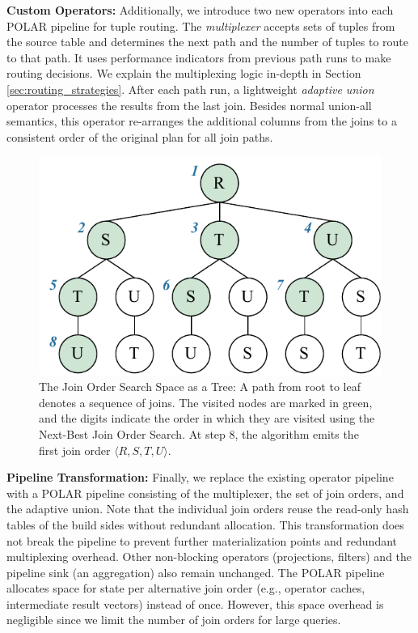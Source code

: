 \textbf{Custom Operators:} Additionally, we introduce two new operators into each POLAR pipeline for tuple routing. The \emph{multiplexer} accepts sets of tuples from the source table and determines the next path and the number of tuples to route to that path. It uses performance indicators from previous path runs to make routing decisions. We explain the multiplexing logic in-depth in Section \ref{sec:routing_strategies}. After each path run, a lightweight \emph{adaptive union} operator processes the results from the last join. Besides normal union-all semantics, this operator re-arranges the additional columns from the joins to a consistent order of the original plan for all join paths.

\begin{figure}[!t]
    \centering
    \includegraphics[width=0.6\linewidth]{figures/join_order_search_space.pdf}
    \vspace{-0.15cm}
    \caption{The Join Order Search Space as a Tree: A path from root to leaf denotes a sequence of joins. The visited nodes are marked in green, and the digits indicate the order in which they are visited using the Next-Best Join Order Search. At step 8, the algorithm emits the first join order $\langle R, S, T, U \rangle$.}
    \label{fig:search_space}
    \vspace{-0.3cm}
\end{figure}

\textbf{Pipeline Transformation:} Finally, we replace the existing operator pipeline with a POLAR pipeline consisting of the multiplexer, the set of join orders, and the adaptive union. Note that the individual join orders reuse the read-only hash tables of the build sides without redundant allocation. This transformation does not break the pipeline to prevent further materialization points and redundant multiplexing overhead. Other non-blocking operators (\eg projections, filters) and the pipeline sink (\eg an aggregation) also remain unchanged. The POLAR pipeline allocates space for state per alternative join order (e.g., operator caches, intermediate result vectors) instead of once. However, this space overhead is negligible since we limit the number of join orders for large queries.


